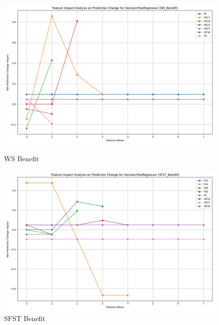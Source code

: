 \begin{figure}[H]
    \centering
    \begin{minipage}{0.495\textwidth}
        \centering
        \includegraphics[width=\linewidth]{analysis/images_reg/feature_impact_prediction_change_WS_Benefit_DecisionTreeRegressor.png}
        \caption{WS Benefit}
        \label{fig:ws_ben_class_analysis_reg}
    \end{minipage}\hfill
    \begin{minipage}{0.495\textwidth}
        \centering
        \includegraphics[width=\linewidth]{analysis/images_reg/feature_impact_prediction_change_SFST_Benefit_DecisionTreeRegressor.png}
        \caption{SFST Benefit}
        \label{fig:sfst_ben_class_analysis_reg}
    \end{minipage}
\end{figure}